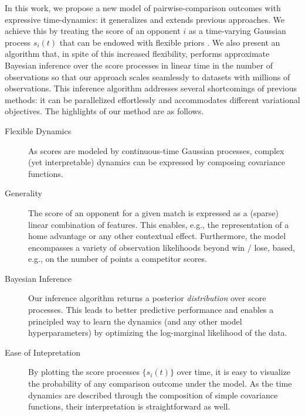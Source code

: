 In this work, we propose a new model of pairwise-comparison outcomes with expressive time-dynamics: it generalizes and extends previous approaches.
We achieve this by treating the score of an opponent $i$ as a time-varying Gaussian process $s_i(t)$ that can be endowed with flexible priors \citep{rasmussen2006gaussian}.
We also present an algorithm that, in spite of this increased flexibility, performs approximate Bayesian inference over the score processes in linear time in the number of observations so that our approach scales seamlessly to datasets with millions of observations.
This inference algorithm addresses several shortcomings of previous methods: it can be parallelized effortlessly and accommodates different variational objectives.
The highlights of our method are as follows.

\begin{description}
\item[Flexible Dynamics]
As scores are modeled by continuous-time Gaussian processes, complex (yet interpretable) dynamics can be expressed by composing covariance functions.

\item[Generality]
The score of an opponent for a given match is expressed as a (sparse) linear combination of features.
This enables, e.g., the representation of a home advantage or any other contextual effect.
Furthermore, the model encompasses a variety of observation likelihoods beyond win / lose, based, e.g., on the number of points a competitor scores.

\item[Bayesian Inference]
Our inference algorithm returns a posterior \emph{distribution} over score processes.
This leads to better predictive performance and enables a principled way to learn the dynamics (and any other model hyperparameters) by optimizing the log-marginal likelihood of the data.

\item[Ease of Intepretation]
By plotting the score processes $\{ s_i(t) \}$ over time, it is easy to visualize the probability of any comparison outcome under the model.
As the time dynamics are described through the composition of simple covariance functions, their interpretation is straightforward as well.
\end{description}

